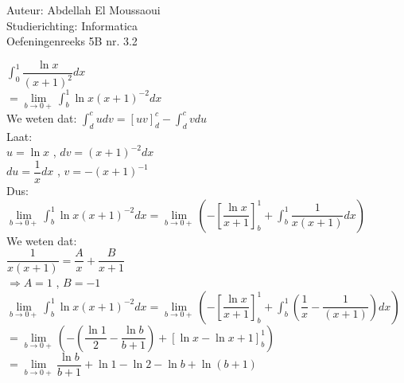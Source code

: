 \documentclass[a4paper]{article}
\begin{document}
  
\noindent \large Auteur: Abdellah El Moussaoui \\
\noindent \large Studierichting: Informatica\\
\noindent \large Oefeningenreeks 5B nr. 3.2\\

\medskip

\normalsize

$\displaystyle\int^1_0\dfrac{\ln{x}}{\left(x+1\right)^2}dx$\\

$=\lim\limits_{b\to0+}\displaystyle\int^1_b\ln{x}\left(x+1\right)^{-2}dx$\\

We weten dat: $\displaystyle\int^c_dudv=\left[uv\right]^c_d-\displaystyle\int^c_dvdu$\\

Laat:\\

$u=\ln{x}$ , $dv=\left(x+1\right)^{-2}dx$\\

$du=\dfrac{1}{x}dx$ , $v=-\left(x+1\right)^{-1}$\\

Dus:\\

$\lim\limits_{b\to0+}\displaystyle\int^1_b\ln{x}\left(x+1\right)^{-2}dx = \lim\limits_{b\to0+} \left(-\left[\dfrac{\ln{x}}{x+1}\right]^1_b+\displaystyle\int^1_b\dfrac{1}{x\left(x+1\right)}dx\right)$\\

We weten dat:\\

$\dfrac{1}{x\left(x+1\right)} = \dfrac{A}{x}+\dfrac{B}{x+1}$\\

$\Rightarrow A=1$ , $B=-1$\\

$\lim\limits_{b\to0+}\displaystyle\int^1_b\ln{x}\left(x+1\right)^{-2}dx = \lim\limits_{b\to0+} \left(-\left[\dfrac{\ln{x}}{x+1}\right]^1_b+\displaystyle\int^1_b\left(\dfrac{1}{x}-\dfrac{1}{\left(x+1\right)}\right)dx\right)$\\

$= \lim\limits_{b\to0+} \left(-\left(\dfrac{\ln{1}}{2}-\dfrac{\ln{b}}{b+1}\right)+\left[\ln{x} - \ln{x+1} \right]^1_b\right)$\\

$= \lim\limits_{b\to0+} \dfrac{\ln{b}}{b+1}+\ln{1} - \ln2 -\ln{b} + \ln\left({b+1}\right)$\\
\end{document}
